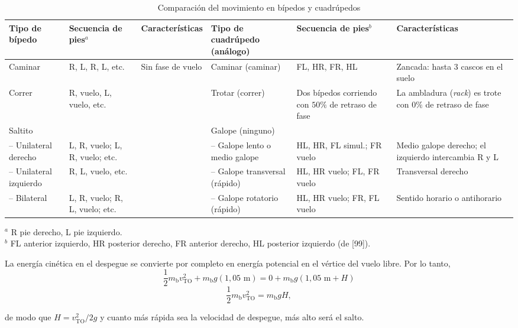 \documentclass[12pt]{book}
\begin{document}
\begin{table}[htbp]
\centering
\caption{Comparación del movimiento en bípedos y cuadrúpedos}
\label{tab:37}
\begin{tabularx}{\textwidth}{lXXlXX}
\toprule
\textbf{Tipo de bípedo} & \textbf{Secuencia de pies}$^a$ & \textbf{Características} & \textbf{Tipo de cuadrúpedo (análogo)} & \textbf{Secuencia de pies}$^b$ & \textbf{Características} \\
\midrule
Caminar & R, L, R, L, etc. & Sin fase de vuelo & Caminar (caminar) & FL, HR, FR, HL & Zancada: hasta 3 cascos en el suelo \\
Correr & R, vuelo, L, vuelo, etc. & & Trotar (correr) & Dos bípedos corriendo con $50\%$ de retraso de fase & La ambladura (\textit{rack}) es trote con $0\%$ de retraso de fase \\
Saltito & & & Galope (ninguno) & & \\
-- Unilateral derecho & L, R, vuelo; L, R, vuelo; etc. & & -- Galope lento o medio galope & HL, HR, FL simul.; FR vuelo & Medio galope derecho; el izquierdo intercambia R y L \\
-- Unilateral izquierdo & R, L, vuelo, etc. & & -- Galope transversal (rápido) & HL, HR vuelo; FL, FR vuelo & Transversal derecho \\
-- Bilateral & L, R, vuelo; R, L, vuelo; etc. & & -- Galope rotatorio (rápido) & HL, HR vuelo; FR, FL vuelo & Sentido horario o antihorario \\
\bottomrule
\end{tabularx}
\begin{flushleft}
    \small $^a$ R pie derecho, L pie izquierdo. \\
    $^b$ FL anterior izquierdo, HR posterior derecho, FR anterior derecho, HL posterior izquierdo (de [99]).
\end{flushleft}
\end{table}

La energía cinética en el despegue se convierte por completo en energía potencial en el vértice del vuelo libre. Por lo tanto,
\begin{equation}
\frac{1}{2} m_{\text{b}} v_{\text{TO}}^2 + m_{\text{b}} g (1,05\text{ m}) = 0 + m_{\text{b}} g (1,05\text{ m} + H)
\label{eq:3.48}
\end{equation}
\begin{equation}
\frac{1}{2} m_{\text{b}} v_{\text{TO}}^2 = m_{\text{b}} g H,
\label{eq:3.49}
\end{equation}

de modo que $H = v_{\text{TO}}^2 / 2g$ y cuanto más rápida sea la velocidad de despegue, más alto será el salto.
\end{document}
